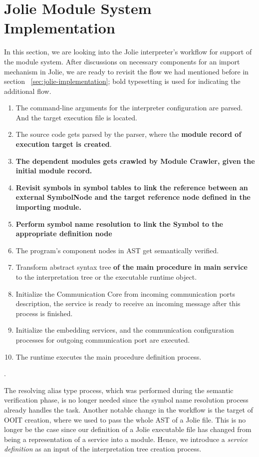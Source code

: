 
\section{Jolie Module System Implementation}

In this section, we are looking into the Jolie interpreter's workflow for support of the module system. After discussions on necessary components for an import mechanism in Jolie, we are ready to revisit the flow we had mentioned before in section ~\ref{sec:jolie-implementation}; bold typesetting is used for indicating the additional flow.

\begin{enumerate}
    \item The command-line arguments for the interpreter configuration are parsed. And the target execution file is located.
    \item The source code gets parsed by the parser, where the \textbf{module record of execution target is created}.
    \item \textbf{The dependent modules gets crawled by Module Crawler, given the initial module record.}
    \item \textbf{Revisit symbols in symbol tables to link the reference between an external SymbolNode and the target reference node defined in the importing module.}
    \item \textbf{Perform symbol name resolution to link the Symbol to the appropriate definition node}
    \item The program's component nodes in AST get semantically verified.
    \item Transform abstract syntax tree \textbf{of the main procedure in main service} to the interpretation tree or the executable runtime object.
    \item Initialize the Communication Core from incoming communication ports description, the service is ready to receive an incoming message after this process is finished.
    \item Initialize the embedding services, and the communication configuration processes for outgoing communication port are executed.
    \item The runtime executes the main procedure definition process.
\end{enumerate}.

The resolving alias type process, which was performed during the semantic verification phase, is no longer needed since the symbol name resolution process already handles the task.
Another notable change in the workflow is the target of OOIT creation, where we used to pass the whole AST of a Jolie file.
This is no longer be the case since our definition of a Jolie executable file has changed from being a representation of a service into a module.
Hence, we introduce a \textit{service definition} as an input of the interpretation tree creation process.